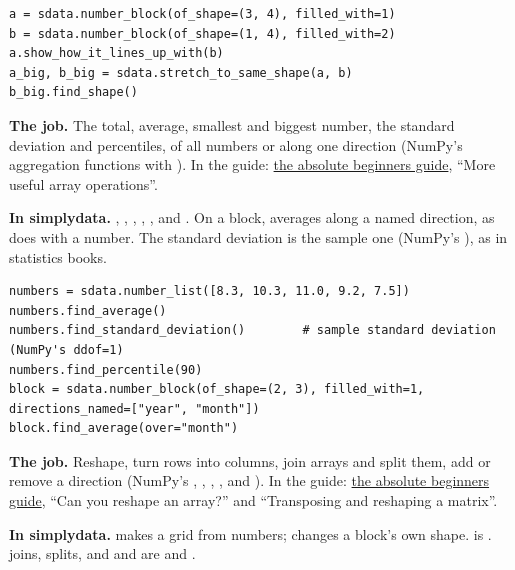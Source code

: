 \begin{lstlisting}[style=py]
a = sdata.number_block(of_shape=(3, 4), filled_with=1)
b = sdata.number_block(of_shape=(1, 4), filled_with=2)
a.show_how_it_lines_up_with(b)
a_big, b_big = sdata.stretch_to_same_shape(a, b)
b_big.find_shape()
\end{lstlisting}


\textbf{The job.} The total, average, smallest and biggest number, the standard deviation and
percentiles, of all numbers or along one direction (NumPy's aggregation functions with
). In the guide: \href{https://numpy.org/doc/stable/user/absolute_beginners.html}{the
absolute beginners guide}, ``More useful array operations''.

\textbf{In simplydata.} , , ,
, ,  and
. On a block,  averages along a named
direction, as  does with a number. The standard deviation is the sample one (NumPy's
), as in statistics books.

\begin{lstlisting}[style=py]
numbers = sdata.number_list([8.3, 10.3, 11.0, 9.2, 7.5])
numbers.find_average()
numbers.find_standard_deviation()        # sample standard deviation (NumPy's ddof=1)
numbers.find_percentile(90)
block = sdata.number_block(of_shape=(2, 3), filled_with=1, directions_named=["year", "month"])
block.find_average(over="month")
\end{lstlisting}


\textbf{The job.} Reshape, turn rows into columns, join arrays and split them, add or remove a
direction (NumPy's , , , ,
 and ). In the guide:
\href{https://numpy.org/doc/stable/user/absolute_beginners.html}{the absolute beginners guide}, ``Can
you reshape an array?'' and ``Transposing and reshaping a matrix''.

\textbf{In simplydata.}  makes a grid from numbers;
 changes a block's own shape. 
is .  joins, 
splits, and  and  are 
and .

